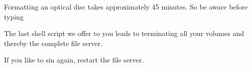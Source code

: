 


\begin{note}
  Formatting an optical disc takes approximately 45 minutes. So be aware
  before typing

\end{note}

The last shell script we offer to you leads to terminating all your volumes
and thereby the complete file server.




If you like to sin again, restart the file server.
